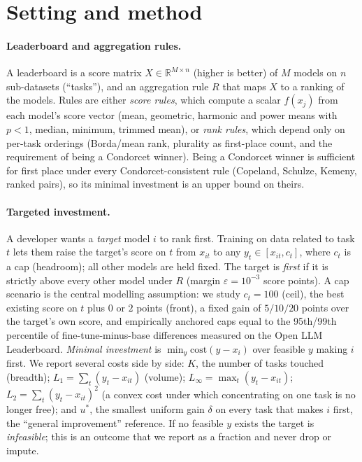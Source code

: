\section{Setting and method}
\label{sec:method}

\paragraph{Leaderboard and aggregation rules.}
A leaderboard is a score matrix $X\in\mathbb{R}^{M\times n}$ (higher is better) of $M$ models on $n$ sub-datasets (``tasks''),
and an aggregation rule $R$ that maps $X$ to a ranking of the models.
Rules are either \emph{score rules}, which compute a scalar $f(x_j)$ from each model's score vector
(mean, geometric, harmonic and power means with $p<1$, median, minimum, trimmed mean),
or \emph{rank rules}, which depend only on per-task orderings
(Borda/mean rank, plurality as first-place count, and the requirement of being a Condorcet winner).
Being a Condorcet winner is sufficient for first place under every Condorcet-consistent rule
(Copeland, Schulze, Kemeny, ranked pairs), so its minimal investment is an upper bound on theirs.

\paragraph{Targeted investment.}
A developer wants a \emph{target} model $i$ to rank first.
Training on data related to task $t$ lets them raise the target's score on $t$ from $x_{it}$ to any $y_t\in[x_{it},c_t]$,
where $c_t$ is a cap (headroom); all other models are held fixed.
The target is \emph{first} if it is strictly above every other model under $R$ (margin $\varepsilon=10^{-3}$ score points).
A cap scenario is the central modelling assumption: we study $c_t=100$ (ceil), the best existing score on $t$ plus $0$ or $2$ points
(front), a fixed gain of $5/10/20$ points over the target's own score, and empirically anchored caps
equal to the 95th/99th percentile of fine-tune-minus-base differences measured on the Open LLM Leaderboard.
\emph{Minimal investment} is $\min_y \mathrm{cost}(y-x_i)$ over feasible $y$ making $i$ first.
We report several costs side by side:
$K$, the number of tasks touched (breadth); $L_1=\sum_t (y_t-x_{it})$ (volume);
$L_\infty=\max_t (y_t-x_{it})$; $L_2=\sum_t (y_t-x_{it})^2$ (a convex cost under which concentrating on one task is no longer free);
and $u^\ast$, the smallest uniform gain $\delta$ on every task that makes $i$ first, the ``general improvement'' reference.
If no feasible $y$ exists the target is \emph{infeasible}; this is an outcome that we report as a fraction and never drop or impute.

